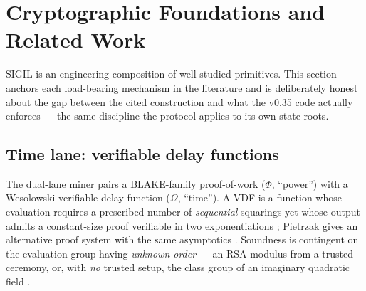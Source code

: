 %
%

\section{Cryptographic Foundations and Related Work}

SIGIL is an engineering composition of well-studied primitives. This section
anchors each load-bearing mechanism in the literature and is deliberately
honest about the gap between the cited construction and what the v0.35 code
actually enforces — the same discipline the protocol applies to its own state
roots.

\subsection{Time lane: verifiable delay functions}
The dual-lane miner pairs a BLAKE-family proof-of-work ($\Phi$, ``power'') with a
Wesolowski verifiable delay function ($\Omega$, ``time''). A VDF is a function
whose evaluation requires a prescribed number of \emph{sequential} squarings yet
whose output admits a constant-size proof verifiable in two exponentiations
\cite{wesolowski2019,boneh2018vdf}; Pietrzak gives an alternative proof system
with the same asymptotics \cite{pietrzak2019}. Soundness is contingent on the
evaluation group having \emph{unknown order} — an RSA modulus from a trusted
ceremony, or, with \emph{no} trusted setup, the class group of an imaginary
quadratic field \cite{wesolowski2019,classgrouphash2024}.

